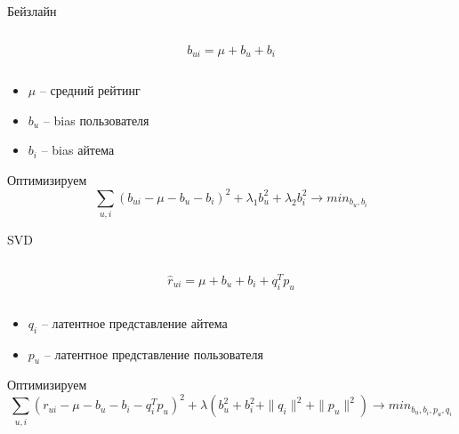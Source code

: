 \documentclass[11pt,aspectratio=169,handout=true]{beamer}
\begin{document}
\begin{frame}{Бейзлайн \cite{KOREN}}

\begin{columns}
\begin{column}{0.2\textwidth} 
\end{column}
\begin{column}{0.5\textwidth} 
\begin{tcolorbox}[colback=info!5,colframe=info!80,title=Модель]
\[
b_{ui} = \mu + b_u + b_i
\]
\end{tcolorbox}
\end{column}
\begin{column}{0.2\textwidth} 
\end{column}
\end{columns}

\vfill

\begin{itemize}
\item $\mu$ -- средний рейтинг
\item $b_u$ -- bias пользователя
\item $b_i$ -- bias айтема
\end{itemize}

\vfill

Оптимизируем
\[
\sum_{u, i} (b_{ui} - \mu - b_u - b_i)^2 + \lambda_1 b_u^2 + \lambda_2 b_i^2 \rightarrow min_{b_u, b_i}
\]

\end{frame}

\begin{frame}{SVD}

\begin{columns}
\begin{column}{0.2\textwidth} 
\end{column}
\begin{column}{0.5\textwidth} 
\begin{tcolorbox}[colback=info!5,colframe=info!80,title=Модель]
\[
\hat r_{ui} = \mu + b_u + b_i + q_i^T p_u
\]
\end{tcolorbox}
\end{column}
\begin{column}{0.2\textwidth} 
\end{column}
\end{columns}

\vfill

\begin{itemize}
\item $q_i$ -- латентное представление айтема
\item $p_u$ -- латентное представление пользователя
\end{itemize}

\vfill

Оптимизируем
\[
\sum_{u, i} (r_{ui} - \mu - b_u - b_i - q_i^T p_u)^2 + \lambda (b_u^2 +  b_i^2 + \| q_i \|^2 + \| p_u \|^2) \rightarrow min_{b_u, b_i, p_u, q_i}
\]

\end{frame}
\end{document}
